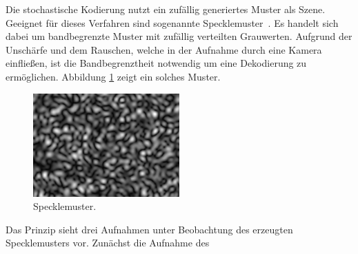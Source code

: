 Die stochastische Kodierung nutzt ein zufällig generiertes Muster als Szene.
Geeignet für dieses Verfahren sind sogenannte \glqq Specklemuster\grqq ~\cite{specklePattern}.
Es handelt sich dabei um bandbegrenzte Muster mit zufällig verteilten Grauwerten.
Aufgrund der Unschärfe und dem Rauschen, welche in der Aufnahme durch eine Kamera einfließen, ist die Bandbegrenztheit notwendig um eine Dekodierung zu ermöglichen.
Abbildung \ref{img:speckleMuster} zeigt ein solches Muster.
%
\begin{figure}[H]
	\centering
	\includegraphics[frame,width=0.5\textwidth]{02_grundlagenZurDeflektometrie/rekonstruktion/stochastischeKodierung/figures/speckleMuster}
	\caption[Specklemuster]{Specklemuster.}
	\label{img:speckleMuster}
\end{figure}
%
Das Prinzip sieht drei Aufnahmen unter Beobachtung des erzeugten Specklemusters vor.
Zunächst die Aufnahme des 